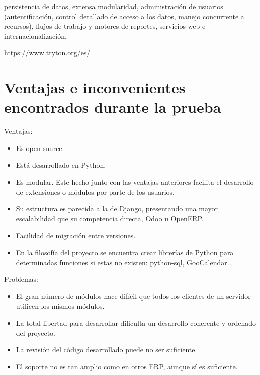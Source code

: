 \documentclass{article}
\begin{document}
persistencia de datos, extensa modularidad, administración de usuarios (autentificación, control detallado de acceso a los datos, manejo concurrente a recursos), flujos de trabajo y motores de reportes, servicios web e internacionalización.

\url{https://www.tryton.org/es/}


\section{Ventajas e inconvenientes encontrados durante la prueba}

Ventajas:

\begin{itemize}
    \item Es open-source.
    \item Está desarrollado en Python.
    \item Es modular. Este hecho junto con las ventajas anteriores facilita el desarrollo de extensiones o módulos por parte de los usuarios.
    \item Su estructura es parecida a la de Django, presentando una mayor escalabilidad que su competencia directa, Odoo u OpenERP.
    \item Facilidad de migración entre versiones.
    \item En la filosofía del proyecto se encuentra crear librerías de Python para determinadas funciones si estas no existen: python-sql, GooCalendar...
\end{itemize}

Problemas:

\begin{itemize}
    \item El gran número de módulos hace difícil que todos los clientes de un servidor utilicen los mismos módulos.
    \item La total libertad para desarrollar dificulta un desarrollo coherente y ordenado del proyecto.
    \item La revisión del código desarrollado puede no ser suficiente.
    \item El soporte no es tan amplio como en otros ERP, aunque sí es suficiente.
\end{itemize}
\end{document}
